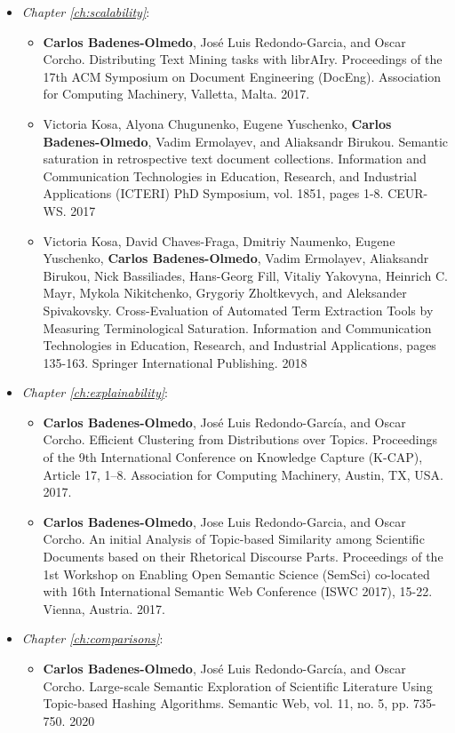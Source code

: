\begin{itemize}
\item \textit{Chapter \ref{ch:scalability}}:
\begin{itemize}
\item \textbf{Carlos Badenes-Olmedo}, José Luis Redondo-Garcia, and Oscar Corcho. Distributing Text Mining tasks with librAIry. Proceedings of the 17th ACM Symposium on Document Engineering (DocEng). Association for Computing Machinery, Valletta, Malta. 2017.
\item Victoria Kosa, Alyona Chugunenko, Eugene Yuschenko, \textbf{Carlos Badenes-Olmedo}, Vadim Ermolayev, and Aliaksandr Birukou. Semantic saturation in retrospective text document collections. Information and Communication Technologies in Education, Research, and Industrial Applications (ICTERI) PhD Symposium, vol. 1851, pages 1-8. CEUR-WS. 2017
\item Victoria Kosa, David Chaves-Fraga, Dmitriy Naumenko, Eugene Yuschenko, \textbf{Carlos Badenes-Olmedo}, Vadim Ermolayev, Aliaksandr Birukou, Nick Bassiliades, Hans-Georg Fill, Vitaliy Yakovyna, Heinrich C. Mayr, Mykola Nikitchenko, Grygoriy Zholtkevych, and Aleksander Spivakovsky. Cross-Evaluation of Automated Term Extraction Tools by Measuring Terminological Saturation. Information and Communication Technologies in Education, Research, and Industrial Applications, pages 135-163. Springer International Publishing. 2018
\end{itemize}
\item \textit{Chapter \ref{ch:explainability}}:
\begin{itemize}
\item \textbf{Carlos Badenes-Olmedo}, José Luis Redondo-García, and Oscar Corcho. Efficient Clustering from Distributions over Topics. Proceedings of the 9th International Conference on Knowledge Capture (K-CAP), Article 17, 1–8. Association for Computing Machinery, Austin, TX, USA. 2017.
\item \textbf{Carlos Badenes-Olmedo}, Jose Luis Redondo-Garcia, and Oscar Corcho. An initial Analysis of Topic-based Similarity among Scientific Documents based on their Rhetorical Discourse Parts. Proceedings of the 1st Workshop on Enabling Open Semantic Science (SemSci) co-located with 16th International Semantic Web Conference (ISWC 2017), 15-22. Vienna, Austria. 2017.
\end{itemize}
\item \textit{Chapter \ref{ch:comparisons}}:
\begin{itemize}
\item \textbf{Carlos Badenes-Olmedo}, José Luis Redondo-García, and Oscar Corcho. Large-scale Semantic Exploration of Scientific Literature Using Topic-based Hashing Algorithms. Semantic Web, vol. 11, no. 5, pp. 735-750. 2020

\end{itemize}
\end{itemize}
